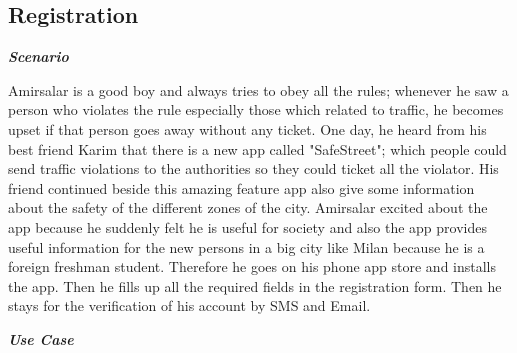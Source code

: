 \subsection{Registration}

\emph{\textbf{Scenario}}

Amirsalar is a good boy and always tries to obey all the rules; whenever he saw a person who violates the rule especially those which related to traffic, he becomes upset if that person goes away without any ticket. One day, he heard from his best friend Karim that there is a new app called "SafeStreet"; which people could send traffic violations to the authorities so they could ticket all the violator. His friend continued beside this amazing feature app also give some information about the safety of the different zones of the city. Amirsalar excited about the app because he suddenly felt he is useful for society and also the app provides useful information for the new persons in a big city like Milan because he is a foreign freshman student. Therefore he goes on his phone app store and installs the app. Then he fills up all the required fields in the registration form. Then he stays for the verification of his account by SMS and Email.

\emph{\textbf{Use Case}}

